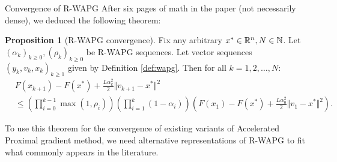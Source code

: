 \documentclass[11pt]{beamer}
\theoremstyle{definition}
\newtheorem{proposition}{Proposition}[section]
\begin{document}
        \begin{frame}{Convergence of R-WAPG}
            After six pages of math in the paper (not necessarily dense), we deduced the following theorem: 
            \begin{proposition}[R-WAPG convergence]\label{prop:wapg-convergence}
                Fix any arbitrary $x^* \in \mathbb R^n, N \in \mathbb N$.
                Let $(\alpha_k)_{k \ge 0}, (\rho_k)_{k \ge 0}$ be R-WAPG sequences.
                Let vector sequences $(y_k, v_{k}, x_{k})_{k \ge 1}$ given by Definition \ref{def:wapg}. 
                Then for all $k = 1, 2, \ldots, N$:
                {\small
                \begin{align*}
                    & F(x_{k + 1}) - F(x^*) + \frac{L \alpha_k^2}{2}\Vert v_{k + 1} - x^*\Vert^2
                    \\
                    &\le
                    \left(
                        \prod_{i = 0}^{k - 1} \max(1, \rho_{i})
                    \right)
                    \left(
                        \prod_{i = 1}^{k} \left(1  - \alpha_i\right)
                    \right)
                    \left(
                        F(x_1) - F(x^*) + \frac{L\alpha_0^2}{2}\Vert v_1 - x^*\Vert^2
                    \right).
                \end{align*}
                }
            \end{proposition}
            To use this theorem for the convergence of existing variants of Accelerated Proximal gradient method, we need alternative representations of R-WAPG to fit what commonly appears in the literature. 
        \end{frame}
\end{document}
